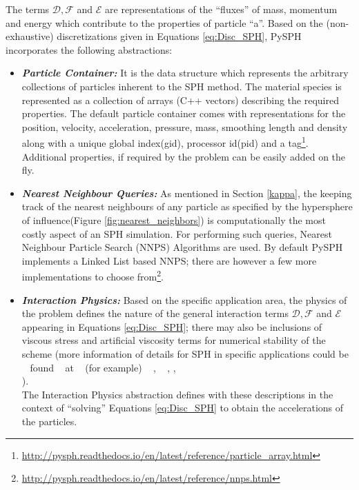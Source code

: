 The terms $\mathcal{D}, \mathcal{F}$ and $\mathcal{E}$ are representations of the ``fluxes'' of mass, momentum and energy which contribute to the properties of particle ``a''. Based on the (non-exhaustive) discretizations given in Equations \eqref{eq:Disc_SPH}, PySPH incorporates the following abstractions:

\begin{itemize}
\item \textbf{\textit{Particle Container: }}It is the data structure which represents the arbitrary collections of particles inherent to the SPH method. The material species is represented as a collection of arrays (C++ vectors) describing the required properties. The default particle container comes with representations for the position, velocity, acceleration, pressure, mass, smoothing length and density along with a unique global index(gid), processor id(pid) and a tag\footnote[3]{\url{http://pysph.readthedocs.io/en/latest/reference/particle_array.html}}. Additional properties, if required by the problem can be easily added on the fly. 

\item \textbf{\textit{Nearest Neighbour Queries: }} As mentioned in Section \ref{kappa}, the keeping track of the nearest neighbours of any particle as specified by the hypersphere of influence(Figure \ref{fig:nearest_neighbors}) is computationally the most costly aspect of an SPH simulation. For performing such queries, Nearest Neighbour Particle Search (NNPS) Algorithms are used. By default PySPH implements a Linked List based NNPS; there are however a few more implementations to choose from\footnote[4]{\url{http://pysph.readthedocs.io/en/latest/reference/nnps.html}}.

\item \textbf{\textit{Interaction Physics: }}Based on the specific application area, the physics of the problem defines the nature of the general interaction terms  $\mathcal{D}, \mathcal{F}$ and $\mathcal{E}$ appearing in Equations \ref{eq:Disc_SPH}; there may also be inclusions of viscous stress and artificial viscosity terms for numerical stability of the scheme (more information of details for SPH in specific applications could be ~ found ~ at ~ (for example) ~ \cite{price}, ~ \cite{monaghan_ARFM}, \cite{monaghan_physics}, \\ \cite{volker_springel}).\\The Interaction Physics abstraction defines with these descriptions in the context of ``solving'' Equations \ref{eq:Disc_SPH} to obtain the accelerations of the particles.


\end{itemize}
